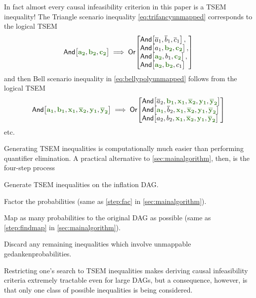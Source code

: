 In fact almost every causal infeasibility criterion in this paper is a TSEM inequality! The Triangle scenario inequality \cref{eq:trifancyunmapped} corresponds to the logical TSEM
\begin{align}
    \NamedFunction{And}{\mgreen{a_2} , \mgreen{b_2} , \mgreen{c_2}}\implies 
\NamedFunction{Or}{\NamedFunction{And}{\n{a}_1 , \n{b}_1 , \n{c}_1},\\ \NamedFunction{And}{a_1 , \mgreen{b_2} , \mgreen{c_2}},\\ \NamedFunction{And}{\mgreen{a_2} , b_1 , \mgreen{c_2}},\\ \NamedFunction{And}{\mgreen{a_2} , \mgreen{b_2} , c_1}}
\end{align}
and then Bell scenario inequality in \cref{eq:bellypolyunmapped} follows from the logical TSEM
\begin{align}
 \NamedFunction{And}{\mgreen{a_1} , \mgreen{b_1} , \mgreen{x_1} , \mgreen{\n{x}_2}, \mgreen{y_1} ,  \mgreen{\n{y}_2}}
\implies
\NamedFunction{Or}{\NamedFunction{And}{\n{a}_2 , \mgreen{b_1} , \mgreen{x_1}, \mgreen{\n{x}_2} , \mgreen{y_1} , \mgreen{\n{y}_2}}\\
\NamedFunction{And}{\mgreen{a_1} , \n{b}_2 , \mgreen{x_1} ,\mgreen{\n{x}_2},\mgreen{y_1},\mgreen{\n{y}_2}}\\
\NamedFunction{And}{a_2 , b_2 , \mgreen{x_1}, \mgreen{\n{x}_2}, \mgreen{y_1}, \mgreen{\n{y}_2}}}
\end{align}
etc.

Generating TSEM inequalities is computationally much easier than performing quantifier elimination. A practical alternative to \cref{sec:mainalgorithm}, then, is the four-step process
\begin{compactenum}
\item Generate TSEM inequalities on the inflation DAG.
\item Factor the probabilities (same as \cref{step:fac} in \cref{sec:mainalgorithm}).
\item Map as many probabilities to the original DAG as possible (same as \cref{step:findmap} in \cref{sec:mainalgorithm}).
\item Discard any remaining inequalities which involve unmappable gedankenprobabilities.
\end{compactenum}
Restricting one's search to TSEM inequalities makes deriving causal infeasibility criteria extremely tractable even for large DAGs, but a consequence, however, is that only one class of possible inequalities is being considered.

